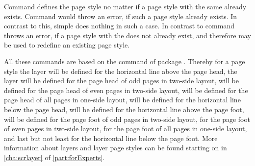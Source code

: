 Command  defines the page style no matter if a page style
with the same  already exists. Command  would
throw an error, if such a page style already exists. In contrast to this,
 simple does nothing in such a case. In contrast to
 command  throws an error, if a page
style with the  does not already exist, and therefore may be used
to redefine an existing page style.

All these commands are based on the command  of
package . Thereby for a page style 
the layer  will be defined for the
horizontal line above the page head, the layer 
will be defined for the page head of odd pages in two-side layout,
 will be defined for the page head of even
pages in two-side layout,  will be defined
for the page head of all pages in one-side layout,
 will be defined for the horizontal line below
the page head,  will be defined for the
horizontal line above the page foot,  will be
defined for the page foot of odd pages in two-side layout,
 for the page foot of even pages in two-side
layout,  for the page foot of all pages in
one-side layout, and last but not least  for
the horizontal line below the page foot. More information about layers and
layer page styles can be found starting on  in
\autoref{cha:scrlayer} of \autoref{part:forExperts}.%
%
